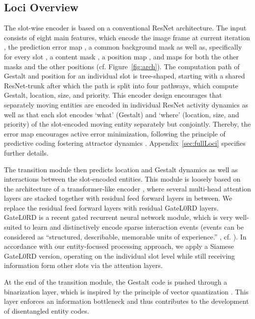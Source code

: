 \documentclass{article} \usepackage{iclr2023_conference_arxiv,times}
\begin{document}
\subsection{Loci Overview}
The slot-wise encoder is based on a conventional ResNet architecture. 
The input consists of eight main features, which encode the image frame  at current iteration , the prediction error map , a common background mask  as well as, specifically for every slot , a content mask , a position map , and maps for both the other masks  and the other positions  (cf. Figure~\ref{fig:arch}).
The computation path of Gestalt and position for an individual slot is tree-shaped, starting with a shared ResNet-trunk after which the path is split into four pathways, which compute Gestalt, location, size, and priority. 
This encoder design encourages that separately moving entities are encoded in individual ResNet activity dynamics as well as that each slot encodes `what' (Gestalt) and `where' (location, size, and priority) of the slot-encoded moving entity separately but conjointly.
Thereby, the error map  encourages active error minimization, following the principle of predictive coding fostering attractor dynamics \citep{Jordan:1986,Rao:1999}.
Appendix~\ref{sec:fullLoci} specifies further details.

The transition module then predicts location  and Gestalt dynamics  as well as interactions between the slot-encoded entities. 
This module is loosely based on the architecture of a transformer-like encoder \citep{vaswani2017attention}, where several multi-head attention layers are stacked together with residual feed forward layers in between.
We replace the residual feed forward layers with residual GateL0RD \citep{gumbsch2021sparsely} layers. 
GateL0RD is a recent gated recurrent neural network module, which is very well-suited to learn and distinctively encode sparse interaction events (events can be considered as ``structured, describable, memorable units of
experience.'' \cite{Baldwin:2021}, cf. \cite{Zacks2007}).
In accordance with our entity-focused processing approach, we apply a Siamese GateL0RD version, operating on the individual slot level while still receiving information form other slots via the attention layers.

At the end of the transition module, the Gestalt code is pushed through a binarization layer, which is inspired by the principle of vector quantization \citep{van2017neural}. 
This layer enforces an information bottleneck and thus contributes to the development of disentangled entity codes.
\end{document}
